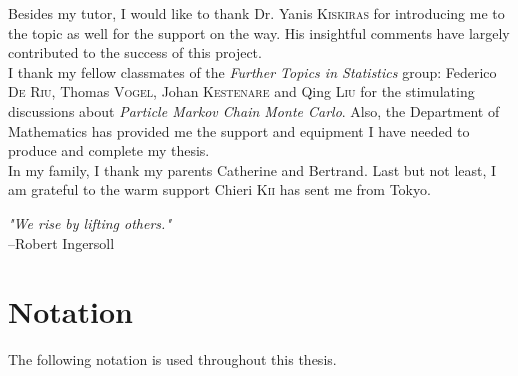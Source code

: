 \documentclass[11pt,a4,twosided,singlespacing,titlepagenumber=on]{scrreprt}
\numberwithin{equation}{chapter} %
\theoremstyle{remark}
\begin{document}
Besides my tutor, I would like to thank Dr. Yanis \textsc{Kiskiras} for introducing me to the topic as well for the support on the way. His insightful comments have largely contributed to the success of this project. \\

I thank my fellow classmates of the \textit{Further Topics in Statistics} group: Federico \textsc{De Riu}, Thomas \textsc{Vogel}, Johan \textsc{Kestenare} and Qing \textsc{Liu} for the stimulating discussions about \textit{Particle Markov Chain Monte Carlo}. Also, the Department of Mathematics has provided me the support and equipment I have needed to produce and complete my thesis. \\

In my family, I thank my parents Catherine and Bertrand. Last but not least, I am grateful to the warm support Chieri \textsc{Kii} has sent me from Tokyo. \\ 

\begin{flushright} \textit{"We rise by lifting others."} \\
--Robert Ingersoll \\
\end{flushright}

\renewcommand{\contentsname}{Table of Contents}
\setcounter{tocdepth}{4}
\setcounter{secnumdepth}{4}

\begin{spacing}{0.9}
\tableofcontents
\listoffigures
\listoftables
\end{spacing}

\chapter*{Notation}
The following notation is used throughout this thesis.
\end{document}
